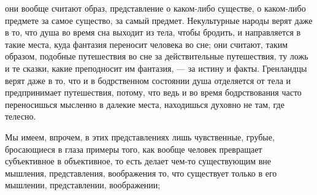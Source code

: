 \documentclass[12pt]{article}
\begin{document}
они вообще считают образ, представление о каком-либо существе, о каком-либо предмете за самое существо, за самый предмет. Некультурные народы верят даже в то, что душа во время сна выходит из тела, чтобы бродить, и направляется в такие места, куда фантазия переносит человека во сне; они считают, таким образом, подобные путешествия во сне за действительные путешествия, ту ложь и те сказки, какие преподносит им фантазия, --- за истину и факты. Гренландцы верят даже в то, что и в бодрственном состоянии душа отделяется от тела и предпринимает путешествия, потому, что ведь и во время бодрствования часто переносишься мысленно в далекие места, находишься духовно не там, где телесно. 

Мы имеем, впрочем, в этих представлениях лишь чувственные, грубые, бросающиеся в глаза примеры того, как вообще человек превращает субъективное в объективное, то есть делает чем-то существующим вне мышления, представления, воображения то, что существует только в его мышлении, представлении, воображении; 
\end{document}
